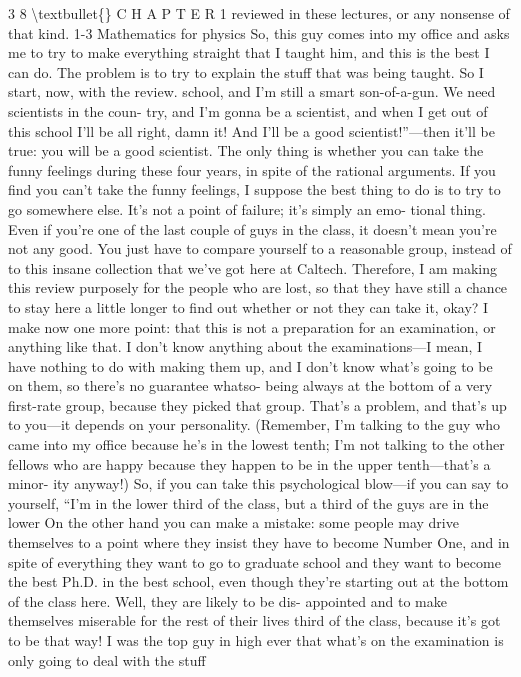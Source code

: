 \documentclass[10pt,oneside]{article}
\begin{document}
3 8 \textbackslash{}textbullet\{\} C H A P T E R  1 reviewed in these lectures, or any nonsense of that kind. 1-3 Mathematics for physics So, this guy comes into my office and asks me to try to make everything straight that I taught him, and this is the best I can do. The problem is to try to explain the stuff that was being taught. So I start, now, with the review. school, and I’m still a smart son-of-a-gun. We need scientists in the coun- try, and I’m gonna be a scientist, and when I get out of this school I’ll be all right, damn it! And I’ll be a good scientist!”---then it’ll be true: you will be a good scientist. The only thing is whether you can take the funny feelings during these four years, in spite of the rational arguments. If you find you can’t take the funny feelings, I suppose the best thing to do is to try to go somewhere else. It’s not a point of failure; it’s simply an emo- tional thing. Even if you’re one of the last couple of guys in the class, it doesn’t mean you’re not any good. You just have to compare yourself to a reasonable group, instead of to this insane collection that we’ve got here at Caltech. Therefore, I am making this review purposely for the people who are lost, so that they have still a chance to stay here a little longer to find out whether or not they can take it, okay? I make now one more point: that this is not a preparation for an examination, or anything like that. I don’t know anything about the examinations---I mean, I have nothing to do with making them up, and I don’t know what’s going to be on them, so there’s no guarantee whatso- being always at the bottom of a very first-rate group, because they picked that group. That’s a problem, and that’s up to you---it depends on your personality. (Remember, I’m talking to the guy who came into my office because he’s in the lowest tenth; I’m not talking to the other fellows who are happy because they happen to be in the upper tenth---that’s a minor- ity anyway!) So, if you can take this psychological blow---if you can say to yourself, “I’m in the lower third of the class, but a third of the guys are in the lower On the other hand you can make a mistake: some people may drive themselves to a point where they insist they have to become Number One, and in spite of everything they want to go to graduate school and they want to become the best Ph.D. in the best school, even though they’re starting out at the bottom of the class here. Well, they are likely to be dis- appointed and to make themselves miserable for the rest of their lives third of the class, because it’s got to be that way! I was the top guy in high ever that what’s on the examination is only going to deal with the stuff\par
\end{document}

